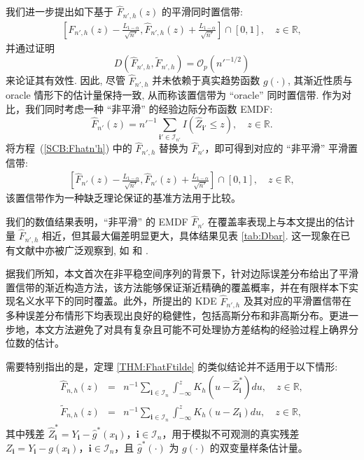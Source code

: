 \documentclass[a4paper,openay,14pt]{ctexbook}
\numberwithin{equation}{section}
\numberwithin{lem}{section}
\begin{document}
我们进一步提出如下基于 $\hat{F}_{n',h}(z)$ 的平滑同时置信带:
\begin{align}\label{SCB:Fhatn'h}
\left[
\hat{F}_{n',h}(z) - \frac{L_{1-\alpha}}{\sqrt{n'}},
\hat{F}_{n',h}(z) + \frac{L_{1-\alpha}}{\sqrt{n'}}
\right] \cap [0,1], 
\quad z \in \mathbb{R},
\end{align}
并通过证明
\[
D\left(\hat{F}_{n',h}, \tilde{F}_{n',h}\right)
= \mathcal{O}_p(n'^{-1/2})
\]
来论证其有效性. 因此, 尽管 $\hat{F}_{n',h}$ 并未依赖于真实趋势函数 $g(\cdot)$, 其渐近性质与 oracle 情形下的估计量保持一致, 从而称该置信带为 ``oracle'' 同时置信带.
作为对比，我们同时考虑一种 ``非平滑'' 的经验边际分布函数 EMDF:
\begin{equation} \label{EQ:Fn'hat}
    \hat{F}_{n'}(z) = n'^{-1}\sum_{\mathbf{i}'\in\mathcal{I}_{n'}} I(\hat{Z}_{\mathbf{i}'} \le z), \quad z \in \mathbb{R}.
\end{equation}
将方程~(\ref{SCB:Fhatn'h}) 中的 $\hat{F}_{n',h}$ 替换为 $\hat{F}_{n'}$，即可得到对应的 ``非平滑'' 平滑置信带:
\begin{align} \label{SCB:Fhatn'}
    \left[ \hat{F}_{n'}(z) - \frac{L_{1-\alpha}}{\sqrt{n'}},  \hat{F}_{n'}(z) + \frac{L_{1-\alpha}}{\sqrt{n'}} \right] \cap [0,1], \quad z \in \mathbb{R},
\end{align}
该置信带作为一种缺乏理论保证的基准方法用于比较。

我们的数值结果表明，``非平滑'' 的 EMDF $\hat{F}_{n'}$ 在覆盖率表现上与本文提出的估计量 $\hat{F}_{n',h}$ 相近，但其最大偏差明显更大，具体结果见表 \ref{tab:Dbar}. 这一现象在已有文献中亦被广泛观察到, 如 \cite{gu2021smooth} 和 \cite{wang2022oracle}.

据我们所知，本文首次在非平稳空间序列的背景下，针对边际误差分布给出了平滑置信带的渐近构造方法，该方法能够保证渐近精确的覆盖概率，并在有限样本下实现名义水平下的同时覆盖。此外，所提出的 KDE $\hat{F}_{n',h}$ 及其对应的平滑置信带在多种误差分布情形下均表现出良好的稳健性，包括高斯分布和非高斯分布。更进一步地，本文方法避免了对具有复杂且可能不可处理协方差结构的经验过程上确界分位数的估计。

需要特别指出的是，定理 \ref{THM:FhatFtilde} 的类似结论并不适用于以下情形:
\begin{eqnarray*}
\hat{F}_{n,h}\left( z \right)
&=& n^{-1} \sum_{\mathbf{i} \in \mathcal{I}_n} \int_{-\infty}^{z}
K_h\left( u - \hat{Z}_{\mathbf{i}}^{\ast} \right) du, \quad z \in \mathbb{R}, \\
\tilde{F}_{n,h}\left( z \right)
&=& n^{-1} \sum_{\mathbf{i} \in \mathcal{I}_n} \int_{-\infty}^{z}
K_h\left( u - Z_{\mathbf{i}} \right) du, \quad z \in \mathbb{R},
\end{eqnarray*}
其中残差 $\hat{Z}_{\mathbf{i}}^{\ast} = Y_{\mathbf{i}} - \hat{g}^{\ast}(x_{\mathbf{i}})$，$\mathbf{i} \in \mathcal{I}_n$，用于模拟不可观测的真实残差 $Z_{\mathbf{i}} = Y_{\mathbf{i}} - g(x_{\mathbf{i}})$，$\mathbf{i} \in \mathcal{I}_n$，且 $\hat{g}^{\ast}(\cdot)$ 为 $g(\cdot)$ 的双变量样条估计量。
\end{document}
